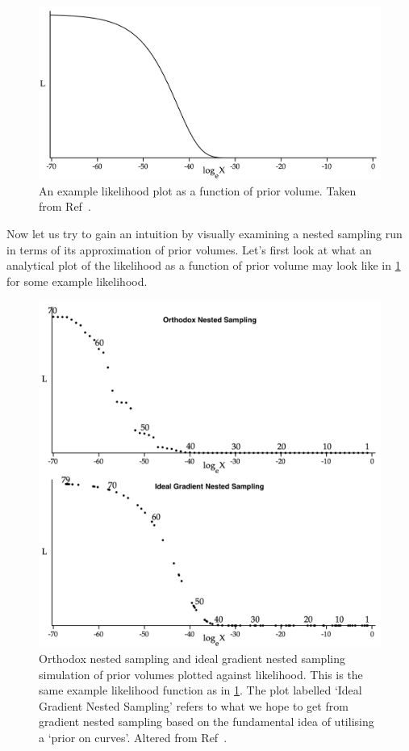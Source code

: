 \begin{figure} 
\centering    
\includegraphics[width=1.0\textwidth]{Chapter2/Figs/Raster/Screenshot 2022-11-08 at 06.29.01.png}
\caption{ An example likelihood plot as a function of prior volume. Taken from Ref~\cite{10.1214/06-BA127}.}
\label{fig:skil1}
\end{figure}

Now let us try to gain an intuition by visually examining a nested sampling run in terms of its approximation of prior volumes. Let's first look at what an analytical plot of the likelihood as a function of prior volume may look like in \cref{fig:skil1} for some example likelihood.

\begin{figure} 
\centering    
\includegraphics[width=1.0\textwidth]{Chapter2/Figs/Raster/Screenshot 2022-11-08 at 06.33.03.png}
\caption{ Orthodox nested sampling and ideal gradient nested sampling simulation of prior volumes plotted against likelihood. This is the same example likelihood function as in \cref{fig:skil1}. The plot labelled `Ideal Gradient Nested Sampling' refers to what we hope to get from gradient nested sampling based on the fundamental idea of utilising a `prior on curves'. Altered from Ref~\cite{10.1214/06-BA127}.}
\label{fig:skil2}
\end{figure}


